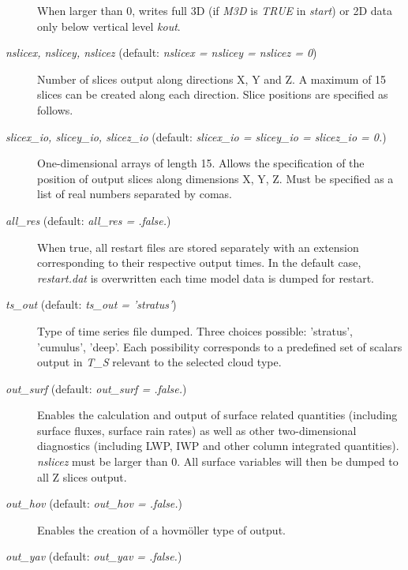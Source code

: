 \documentclass[12pt,A4,french]{article}
\begin{document}
\begin{description}
When larger than 0, writes full 3D (if {\it M3D} is {\it TRUE} in {\it start}) or 2D data only below vertical level {\it kout}.

\item[{\it nslicex, nslicey, nslicez} (default: {\it nslicex = nslicey = nslicez = 0})]

Number of slices output along directions X, Y and Z. A maximum of 15 slices can be created along each direction. Slice positions are specified as follows.

\item[{\it slicex\_io, slicey\_io, slicez\_io} (default: {\it slicex\_io = slicey\_io = slicez\_io = 0.})]

One-dimensional arrays of length 15. Allows the specification of the position of output slices along dimensions X, Y, Z. Must be specified as a list of real numbers separated by comas. 

\item[{\it all\_res} (default: {\it all\_res = .false.})]

When true, all restart files are stored separately with an extension corresponding to their respective output times. In the default case, {\it restart.dat} is overwritten each time model data is dumped for restart.

\item[{\it ts\_out} (default: {\it ts\_out = 'stratus'})]

Type of time series file dumped. Three choices possible: 'stratus', 'cumulus', 'deep'. Each possibility corresponds to a predefined set of scalars output in {\it T\_S} relevant to the selected cloud type.

\item[{\it out\_surf} (default: {\it out\_surf = .false.})]

Enables the calculation and output of surface related quantities (including surface fluxes, surface rain rates) as well as other two-dimensional diagnostics (including LWP, IWP and other column integrated quantities). {\it nslicez} must be larger than 0. All surface variables will then be dumped to all Z slices output.

\item[{\it out\_hov} (default: {\it out\_hov = .false.})]

Enables the creation of a hovm\"{o}ller type of output. 

\item[{\it out\_yav} (default: {\it out\_yav = .false.})]


\end{description}
\end{document}
